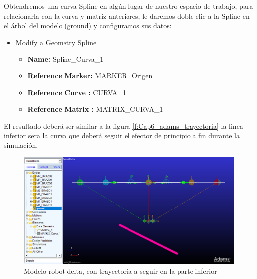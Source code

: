         Obtendremos una curva Spline en algún lugar de nuestro espacio de trabajo, para relacionarla con la curva y matriz anteriores, le daremos doble clic a la Spline en el árbol del modelo (ground) y configuramos sus datos:
        
        \begin{scope}
            \renewcommand{\labelitemi}{\blacklozenge}
            \renewcommand{\labelitemii}{\checkmark}
            \begin{itemize}
                \item Modify a Geometry Spline
                \begin{itemize}
                    \item \textbf{Name:} Spline\_Curva\_1
                    \item \textbf{Reference Marker:} MARKER\_Origen
                    \item \textbf{Reference Curve :} CURVA\_1
                    \item \textbf{Reference Matrix :} MATRIX\_CURVA\_1
                \end{itemize}
            \end{itemize}
        \end{scope}
        
        El resultado deberá ser similar a la figura \eqref{f:Cap6_adams_trayectoria} la linea inferior sera la curva que deberá seguir el efector de principio a fin durante la simulación.
        
        \begin{figure}[H]
            \centering
            \includegraphics[width=1\linewidth]{Main/Chapter6/Images6/adams/trayectoria/curva.png}
            \caption{Modelo robot delta, con trayectoria a seguir en la parte inferior}
            \label{f:Cap6_adams_trayectoria}
        \end{figure}
        
